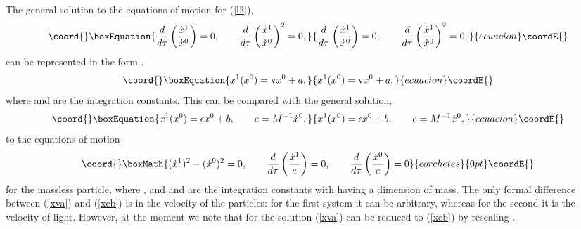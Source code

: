 \documentclass[a4paper,12pt]{article}
\begin{document}
The general solution to the equations of motion for
(\ref{l2}),
\begin{equation}\coord{}\boxEquation{
\frac{d}{d\tau}
\left(
\frac{\dot{x}{}^1}{\dot{x}{}^0}\right)=0,
\qquad
\frac{d}{d\tau}
\left(
\frac{\dot{x}{}^1}{\dot{x}{}^0}\right)^2=0,
\label{x1x0}
}{
\frac{d}{d\tau}
\left(
\frac{\dot{x}{}^1}{\dot{x}{}^0}\right)=0,
\qquad
\frac{d}{d\tau}
\left(
\frac{\dot{x}{}^1}{\dot{x}{}^0}\right)^2=0,
}{ecuacion}\coordE{}\end{equation}
can be represented in the form
\coordHE{},
\begin{equation}\coord{}\boxEquation{
x^1(x^0)={\rm v} x^0+a,
\label{xva}
}{
x^1(x^0)={\rm v} x^0+a,
}{ecuacion}\coordE{}\end{equation}
where \coordHE{} and \coordHE{} are the integration constants.
This can be compared with the general solution,
\begin{equation}\coord{}\boxEquation{
x^1(x^0)=\epsilon x^0+b,\qquad
e=M^{-1} \dot{x}{}^0,
\label{xeb}
}{
x^1(x^0)=\epsilon x^0+b,\qquad
e=M^{-1} \dot{x}{}^0,
}{ecuacion}\coordE{}\end{equation}
to the equations of motion
\[\coord{}\boxMath{
(\dot{x}{}^{1})^2-(\dot{x}{}^0)^2=0,\qquad
\frac{d}{d\tau}
\left(
\frac{\dot{x}{}^1}{e}\right)=0,\qquad
\frac{d}{d\tau}
\left(
\frac{\dot{x}{}^0}{e}\right)=0
}{corchetes}{0pt}\coordE{}\]
for the massless particle,
where \myHighlight{$\epsilon=\pm $}\coordHE{}, and \coordHE{} and  \coordHE{} are the integration
constants
with \coordHE{} having a dimension of mass.
The only formal difference
between (\ref{xva}) and (\ref{xeb})
is in the velocity
of the particles: for the first system it can be arbitrary,
whereas for the second it is the velocity of light.
However, at the moment we note that
for \coordHE{}
the solution (\ref{xva}) can be
reduced to (\ref{xeb})
by rescaling \coordHE{}.
\end{document}
